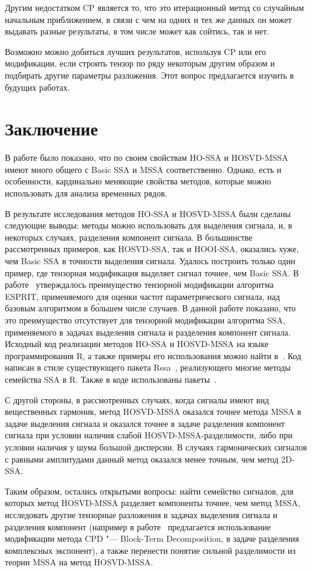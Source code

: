 \documentclass[specialist,
  substylefile=spbu.rtx,
subf,href,colorlinks=true, 12pt]{disser}
\theoremstyle{plain}
\theoremstyle{definition}
\theoremstyle{remark}
\begin{document}
Другим недостатком CP является то, что это итерационный метод со случайным начальным приближением, в связи
с чем на одних и тех же данных он может выдавать разные результаты, в том числе может как сойтись, так и нет.

Возможно можно добиться лучших результатов, используя CP или его модификации, если строить тензор по ряду
некоторым другим образом и подбирать другие параметры разложения.
Этот вопрос предлагается изучить в будущих работах.
\newpage


\section{Заключение}\label{sec:conclusion}
В работе было показано, что по своим свойствам HO-SSA и HOSVD-MSSA имеют много общего
с Basic SSA и MSSA соответственно.
Однако, есть и особенности, кардинально меняющие свойства методов, которые можно использовать для анализа временных рядов.

В результате исследования методов HO-SSA и HOSVD-MSSA были сделаны следующие выводы:
методы можно использовать для выделения сигнала, и, в некоторых случаях, разделения компонент сигнала.
В большинстве рассмотренных примеров, как HOSVD-SSA, так и HOOI-SSA, оказались хуже,
чем Basic SSA в точности выделения сигнала.
Удалось построить только один пример, где тензорная модификация выделяет сигнал точнее, чем Basic SSA.
В работе~\cite{hosvd-hooi-separation} утверждалось преимущество тензорной модификации алгоритма
ESPRIT, применяемого для оценки частот параметрического сигнала, над базовым алгоритмом в б\'{о}льшем числе случаев.
В данной работе показано, что это преимущество отсутствует для тензорной модификации алгоритма SSA, применяемого в задачах выделения сигнала и разделения компонент сигнала.
Исходный код реализации методов HO-SSA и HOSVD-MSSA на языке программирования R, а также
примеры его использования можно найти в~\cite{Rcode}.
Код написан в стиле существующего пакета Rssa~\cite{Rssa-pack, Rssa}, реализующего многие методы семейства SSA в R.
Также в коде использованы пакеты~\cite{rTensor-pack, tensr-pack, purrr-pack}.

С другой стороны, в рассмотренных случаях, когда сигналы имеют вид вещественных гармоник, метод HOSVD-MSSA оказался
точнее метода MSSA в задаче выделения сигнала и оказался точнее в задаче разделения компонент сигнала
при условии наличия слабой HOSVD-MSSA-разделимости, либо при условии наличия у шума большой дисперсии.
В случаях гармонических сигналов с равными амплитудами данный метод оказался менее точным, чем метод 2D-SSA.

Таким образом, остались открытыми вопросы: найти семейство сигналов, для которых метод HOSVD-MSSA
разделяет компоненты точнее, чем метод MSSA, исследовать другие тензорные разложения в задачах выделения сигнала
и разделения компонент (например в работе~\cite{cpd-separation} предлагается использование модификации метода CPD
"--- Block-Term Decomposition, в задаче разделения комплексных экспонент), а также
перенести понятие сильной разделимости из теории MSSA на метод HOSVD-MSSA.



\end{document}

